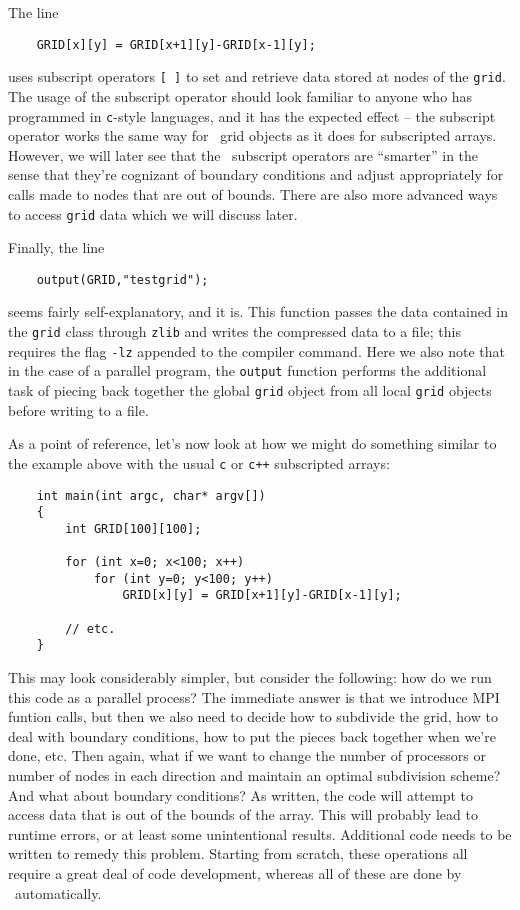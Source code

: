 The line
\begin{shadebox}
\begin{verbatim}
    GRID[x][y] = GRID[x+1][y]-GRID[x-1][y];
\end{verbatim}
\end{shadebox}
uses subscript operators {\tt [ ]} to set and retrieve data stored at nodes of the {\tt grid}.  The usage of the subscript operator should look familiar to anyone who has programmed in {\tt c}-style languages, and it has the expected effect -- the subscript operator works the same way for \MMSP\ grid objects as it does for subscripted arrays.  However, we will later see that the \MMSP\ subscript operators are ``smarter'' in the sense that they're cognizant of boundary conditions and adjust appropriately for calls made to nodes that are out of bounds.  There are also more advanced ways to access {\tt grid} data which we will discuss later.

Finally, the line 
\begin{shadebox}
\begin{verbatim}
    output(GRID,"testgrid");
\end{verbatim}
\end{shadebox}
seems fairly self-explanatory, and it is.  This function passes the data contained in the {\tt grid} class through {\tt zlib} and writes the compressed data to a file; this requires the flag {\tt -lz} appended to the compiler command.  Here we also note that in the case of a parallel program, the {\tt output} function performs the additional task of piecing back together the global {\tt grid} object from all local {\tt grid} objects before writing to a file.

As a point of reference, let's now look at how we might do something similar to the example above with the usual {\tt c} or {\tt c++} subscripted arrays:
\begin{shadebox}
\begin{verbatim}
    int main(int argc, char* argv[])
    {
        int GRID[100][100];

        for (int x=0; x<100; x++)
            for (int y=0; y<100; y++)
                GRID[x][y] = GRID[x+1][y]-GRID[x-1][y];

        // etc.
    }
\end{verbatim}
\end{shadebox}
This may look considerably simpler, but consider the following: how do we run this code as a parallel process?  The immediate answer is that we introduce MPI funtion calls, but then we also need to decide how to subdivide the grid, how to deal with boundary conditions, how to put the pieces back together when we're done, etc.  Then again, what if we want to change the number of processors or number of nodes in each direction and maintain an optimal subdivision scheme?  And what about boundary conditions?  As written, the code will attempt to access data that is out of the bounds of the array.  This will probably lead to runtime errors, or at least some unintentional results.  Additional code needs to be written to remedy this problem.  Starting from scratch, these operations all require a great deal of code development, whereas all of these are done by \MMSP\ automatically.



